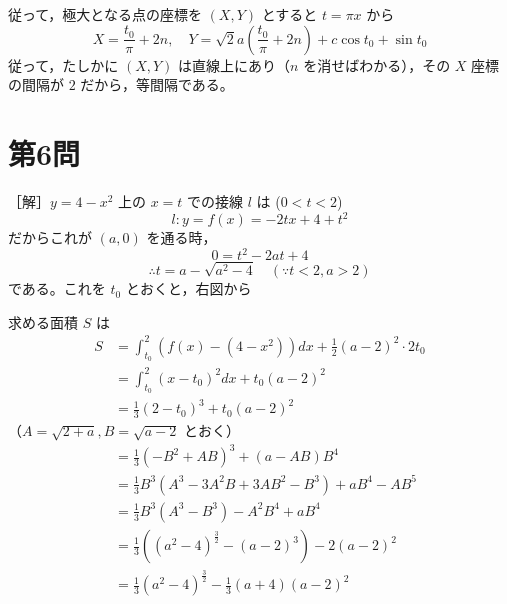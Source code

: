 \documentclass[../main.tex]{subfiles}
\begin{document}
従って，極大となる点の座標を $(X, Y)$ とすると $t = \pi x$ から
\[
  X = \frac{t_0}{\pi} + 2n, \quad Y = \sqrt{2} a \left( \frac{t_0}{\pi} + 2n \right) + c \cos t_0 + \sin t_0
\]
従って，たしかに $(X, Y)$ は直線上にあり（$n$ を消せばわかる），その $X$ 座標の間隔が $2$ だから，等間隔である。

\newpage

\section*{第6問}

［解］$y = 4 - x^2$ 上の $x = t$ での接線 $l$ は ($0 < t < 2$)
\[
  l: y = f(x) = -2tx + 4 + t^2
\]
だからこれが $(a, 0)$ を通る時，
\[
  0 = t^2 - 2at + 4
\]
\[
  \therefore t = a - \sqrt{a^2 - 4} \quad (\because t < 2, a > 2)
\]
である。これを $t_0$ とおくと，右図から

\begin{center}
\end{center}

求める面積 $S$ は
\begin{align*}
  S &= \int_{t_0}^2 (f(x) - (4-x^2)) dx + \frac{1}{2} (a-2)^2 \cdot 2t_0 \\
  &= \int_{t_0}^2 (x - t_0)^2 dx + t_0 (a-2)^2 \\
  &= \frac{1}{3} (2 - t_0)^3 + t_0 (a-2)^2
\end{align*}
（$A = \sqrt{2+a}, B = \sqrt{a-2}$ とおく）
\begin{align*}
  &= \frac{1}{3} (-B^2 + AB)^3 + (a - AB) B^4 \\
  &= \frac{1}{3} B^3 (A^3 - 3A^2 B + 3AB^2 - B^3) + aB^4 - AB^5 \\
  &= \frac{1}{3} B^3 (A^3 - B^3) - A^2 B^4 + aB^4 \\
  &= \frac{1}{3} \left( (a^2-4)^{\frac{3}{2}} - (a-2)^3 \right) - 2(a-2)^2 \\
  &= \frac{1}{3} (a^2-4)^{\frac{3}{2}} - \frac{1}{3} (a+4)(a-2)^2
\end{align*}
\end{document}
